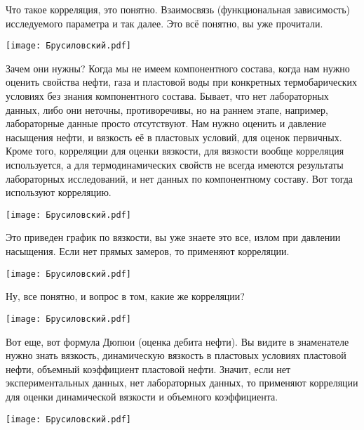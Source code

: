 \documentclass[main.tex]{subfiles}
\begin{document}
Что такое корреляция, это понятно.
Взаимосвязь (функциональная зависимость) исследуемого параметра и так далее.
Это всё понятно, вы уже прочитали.

\begin{center}
\texttt{[image: Брусиловский.pdf]}
\end{center}

Зачем они нужны?
Когда мы не имеем компонентного состава, когда нам нужно оценить свойства нефти, газа и пластовой воды при конкретных термобарических условиях без знания компонентного состава.
Бывает, что нет лабораторных данных, либо они неточны, противоречивы, но на раннем этапе, например, лабораторные данные просто отсутствуют.
Нам нужно оценить и давление насыщения нефти, и вязкость её в пластовых условий, для оценок первичных.
Кроме того, корреляции для оценки вязкости, для вязкости вообще корреляция используется, а для термодинамических свойств не всегда имеются результаты лабораторных исследований, и нет данных по компонентному составу.
Вот тогда используют корреляцию.

\begin{center}
\texttt{[image: Брусиловский.pdf]}
\end{center}

Это приведен график по вязкости, вы уже знаете это все, излом при давлении насыщения.
Если нет прямых замеров, то применяют корреляции.

\begin{center}
\texttt{[image: Брусиловский.pdf]}
\end{center}

Ну, все понятно, и вопрос в том, какие же корреляции?

\begin{center}
\texttt{[image: Брусиловский.pdf]}
\end{center}

Вот еще, вот формула Дюпюи (оценка дебита нефти).
Вы видите в знаменателе нужно знать вязкость, динамическую вязкость в пластовых условиях пластовой нефти, объемный коэффициент пластовой нефти.
Значит, если нет экспериментальных данных, нет лабораторных данных, то применяют корреляции для оценки динамической вязкости и объемного коэффициента.

\begin{center}
\texttt{[image: Брусиловский.pdf]}
\end{center}
\end{document}
